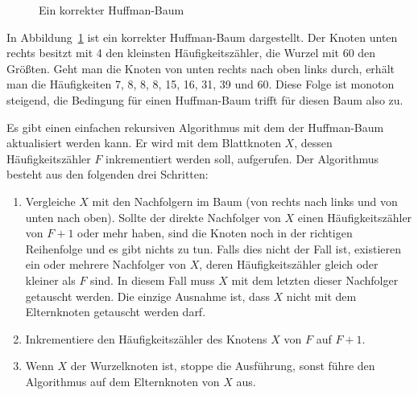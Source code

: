 \documentclass[twoside,11pt,a4paper]{article}
\theoremstyle{break}
\begin{document}
\begin{figure}[h]
\centering
{}
\caption{Ein korrekter Huffman-Baum} \label{fig:HCORR}
\end{figure}

In Abbildung~\ref{fig:HCORR} ist ein korrekter Huffman-Baum
dargestellt. Der Knoten unten rechts besitzt mit 4 den kleinsten
Häufigkeitszähler, die Wurzel mit 60 den Größten. Geht man die Knoten
von unten rechts nach oben links durch, erhält man die Häufigkeiten 7,
8, 8, 8, 15, 16, 31, 39 und 60. Diese Folge ist monoton steigend, die
Bedingung für einen Huffman-Baum trifft für diesen Baum also zu.

Es gibt einen einfachen rekursiven Algorithmus mit dem der
Huffman-Baum aktualisiert werden kann. Er wird mit dem Blattknoten
$X$, dessen Häufigkeitszähler $F$ inkrementiert werden soll,
aufgerufen. Der Algorithmus besteht aus den folgenden drei Schritten:

\begin{enumerate}
\item Vergleiche $X$ mit den Nachfolgern im Baum (von rechts nach
  links und von unten nach oben). Sollte der direkte Nachfolger von
  $X$ einen Häufigkeitszähler von $F+1$ oder mehr haben, sind die
  Knoten noch in der richtigen Reihenfolge und es gibt nichts zu tun.
  Falls dies nicht der Fall ist, existieren ein oder mehrere
  Nachfolger von $X$, deren Häufigkeitszähler gleich oder kleiner als
  $F$ sind. In diesem Fall muss $X$ mit dem letzten dieser Nachfolger
  getauscht werden. Die einzige Ausnahme ist, dass $X$ nicht mit dem
  Elternknoten getauscht werden darf.
\item Inkrementiere den Häufigkeitszähler des Knotens $X$ von $F$ auf
  $F+1$.
\item Wenn $X$ der Wurzelknoten ist, stoppe die Ausführung, sonst
  führe den Algorithmus auf dem Elternknoten von $X$ aus.
\end{enumerate}
\end{document}
